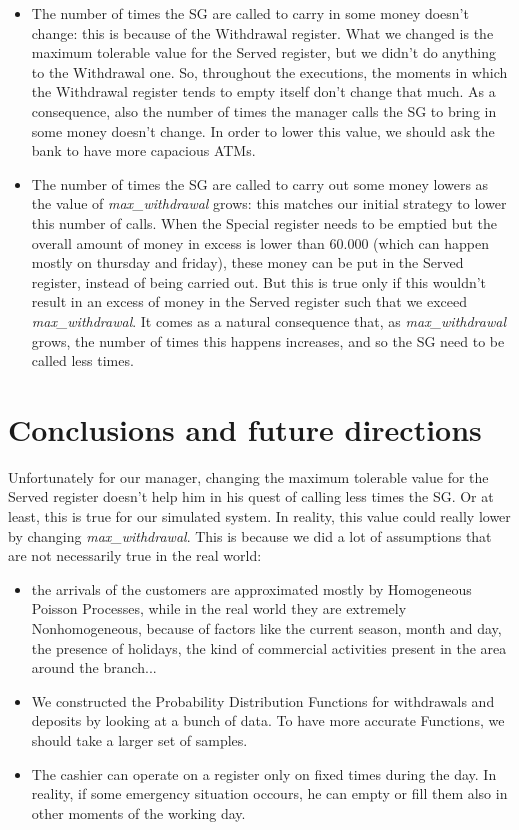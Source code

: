 \documentclass{article}
\begin{document}
\begin{itemize}
    \item The number of times the SG are called to carry in some money doesn't change: this is because of the Withdrawal register. What we changed is the maximum tolerable value for the Served register, but we didn't do anything to the Withdrawal one. So, throughout the executions, the moments in which the Withdrawal register tends to empty itself don't change that much. As a consequence, also the number of times the manager calls the SG to bring in some money doesn't change. In order to lower this value, we should ask the bank to have more capacious ATMs.
    \item The number of times the SG are called to carry out some money lowers as the value of \emph{max\_withdrawal} grows: this matches our initial strategy to lower this number of calls. When the Special register needs to be emptied but the overall amount of money in excess is lower than 60.000 (which can happen mostly on thursday and friday), these money can be put in the Served register, instead of being carried out. But this is true only if this wouldn't result in an excess of money in the Served register such that we exceed \emph{max\_withdrawal}. It comes as a natural consequence that, as \emph{max\_withdrawal} grows, the number of times this happens increases, and so the SG need to be called less times.
\end{itemize}
\section{Conclusions and future directions}
Unfortunately for our manager, changing the maximum tolerable value for the Served register doesn't help him in his quest of calling less times the SG. Or at least, this is true for our simulated system. In reality, this value could really lower by changing \emph{max\_withdrawal}. This is because we did a lot of assumptions that are not necessarily true in the real world: 
\begin{itemize}
    \item the arrivals of the customers are approximated mostly by Homogeneous Poisson Processes, while in the real world they are extremely Nonhomogeneous, because of factors like the current season, month and day, the presence of holidays, the kind of commercial activities present in the area around the branch...
    \item We constructed the Probability Distribution Functions for withdrawals and deposits by looking at a bunch of data. To have more accurate Functions, we should take a larger set of samples.
    \item The cashier can operate on a register only on fixed times during the day. In reality, if some emergency situation occours, he can empty or fill them also in other moments of the working day. 
\end{itemize}
\end{document}
